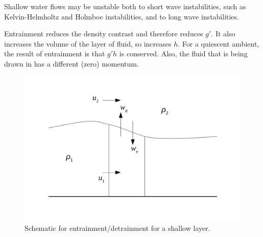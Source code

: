 Shallow water flows may be unstable both to short wave instabilities, such as Kelvin-Helmholtz and Holmboe instabilities, and to long wave instabilities. 

Entrainment reduces the density contrast and therefore reduces $g'$. It also increases the volume of the layer of fluid, so increases $h$. For a quiescent ambient, the result of entrainment is that $g'h$ is conserved. Also, the fluid that is being drawn in has a different (zero) momentum. 

\begin{figure}
\begin{center}
\includegraphics[width=16cm]{entrainment-shallow-water.pdf}
\caption{Schematic for entrainment/detrainment for a shallow layer.}
\label{fig:entrainment-shallow-water}
\end{center}
\end{figure}

